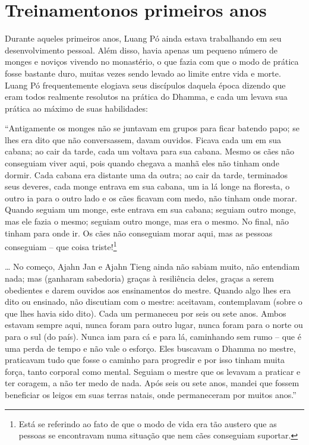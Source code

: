 \chapter[Treinamento nos primeiros anos]{Treinamento\newline nos primeiros anos}

Durante aqueles primeiros anos, Luang Pó ainda estava trabalhando em seu
desenvolvimento pessoal. Além disso, havia apenas um pequeno número de
monges e noviços vivendo no monastério, o que fazia com que o modo de
prática fosse bastante duro, muitas vezes sendo levado ao limite entre
vida e morte. Luang Pó frequentemente elogiava seus discípulos daquela
época dizendo que eram todos realmente resolutos na prática do Dhamma, e
cada um levava sua prática ao máximo de suas habilidades:

``Antigamente os monges não se juntavam em grupos para ficar batendo
papo; se lhes era dito que não conversassem, davam ouvidos. Ficava cada
um em sua cabana; ao cair da tarde, cada um voltava para sua cabana.
Mesmo os cães não conseguiam viver aqui, pois quando chegava a manhã
eles não tinham onde dormir. Cada cabana era distante uma da outra; ao
cair da tarde, terminados seus deveres, cada monge entrava em sua
cabana, um ia lá longe na floresta, o outro ia para o outro lado e os
cães ficavam com medo, não tinham onde morar. Quando seguiam um monge,
este entrava em sua cabana; seguiam outro monge, mas ele fazia o mesmo;
seguiam outro monge, mas era o mesmo. No final, não tinham para onde ir.
Os cães não conseguiam morar aqui, mas as pessoas conseguiam -- que
coisa triste!\footnote{Está se referindo ao fato de que o modo de vida
  era tão austero que as pessoas se encontravam numa situação que nem
  cães conseguiam suportar.}

\ldots{} No começo, Ajahn Jan e Ajahn Tieng ainda não sabiam muito, não
entendiam nada; mas (ganharam sabedoria) graças à resiliência deles,
graças a serem obedientes e darem ouvidos aos ensinamentos do mestre.
Quando algo lhes era dito ou ensinado, não discutiam com o mestre:
aceitavam, contemplavam (sobre o que lhes havia sido dito). Cada um
permaneceu por seis ou sete anos. Ambos estavam sempre aqui, nunca foram
para outro lugar, nunca foram para o norte ou para o sul (do país).
Nunca iam para cá e para lá, caminhando sem rumo -- que é uma perda de
tempo e não vale o esforço. Eles buscavam o Dhamma no mestre, praticavam
tudo que fosse o caminho para progredir e por isso tinham muita força,
tanto corporal como mental. Seguiam o mestre que os levavam a praticar e
ter coragem, a não ter medo de nada. Após seis ou sete anos, mandei que
fossem beneficiar os leigos em suas terras natais, onde permaneceram por
muitos anos.''

